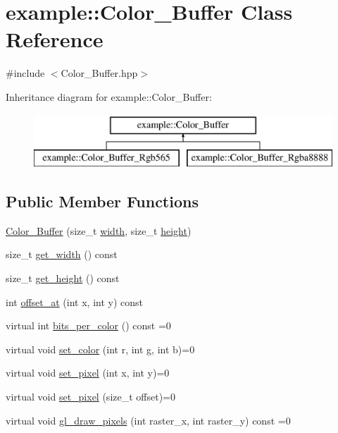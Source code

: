 \hypertarget{classexample_1_1_color___buffer}{}\section{example\+::Color\+\_\+\+Buffer Class Reference}
\label{classexample_1_1_color___buffer}


{\ttfamily \#include $<$Color\+\_\+\+Buffer.\+hpp$>$}

Inheritance diagram for example\+::Color\+\_\+\+Buffer\+:\begin{figure}[H]
\begin{center}
\leavevmode
\includegraphics[height=2.000000cm]{classexample_1_1_color___buffer}
\end{center}
\end{figure}
\subsection*{Public Member Functions}
\begin{DoxyCompactItemize}
\item 
\mbox{\hyperlink{classexample_1_1_color___buffer_a44c19770a14b0f8e46e7ceda1df5fc3d}{Color\+\_\+\+Buffer}} (size\+\_\+t \mbox{\hyperlink{classexample_1_1_color___buffer_ab61454d4b35cbba00d2e634d14ed20ac}{width}}, size\+\_\+t \mbox{\hyperlink{classexample_1_1_color___buffer_ae01f4538ee30af1d3072a425c5ad37ac}{height}})
\item 
size\+\_\+t \mbox{\hyperlink{classexample_1_1_color___buffer_a0bbc4a120bc04b512e303baf8330ff82}{get\+\_\+width}} () const
\item 
size\+\_\+t \mbox{\hyperlink{classexample_1_1_color___buffer_a4d1495a260205b83e1bd28dd04c6eda2}{get\+\_\+height}} () const
\item 
int \mbox{\hyperlink{classexample_1_1_color___buffer_ae316a2df43a9ead02cc45170a8d0f7ed}{offset\+\_\+at}} (int x, int y) const
\item 
virtual int \mbox{\hyperlink{classexample_1_1_color___buffer_a76463553dc782f2dc24a61bec708e273}{bits\+\_\+per\+\_\+color}} () const =0
\item 
virtual void \mbox{\hyperlink{classexample_1_1_color___buffer_a3fbfa949ee340ccdb40ad0ce8339b827}{set\+\_\+color}} (int r, int g, int b)=0
\item 
virtual void \mbox{\hyperlink{classexample_1_1_color___buffer_a967ea326ec0889a36db523727a8154b5}{set\+\_\+pixel}} (int x, int y)=0
\item 
virtual void \mbox{\hyperlink{classexample_1_1_color___buffer_a1c919e629ef74e418e1ad416d0a5e85a}{set\+\_\+pixel}} (size\+\_\+t offset)=0
\item 
virtual void \mbox{\hyperlink{classexample_1_1_color___buffer_a793b667028b2eb7efde2cee76066eac7}{gl\+\_\+draw\+\_\+pixels}} (int raster\+\_\+x, int raster\+\_\+y) const =0
\end{DoxyCompactItemize}
